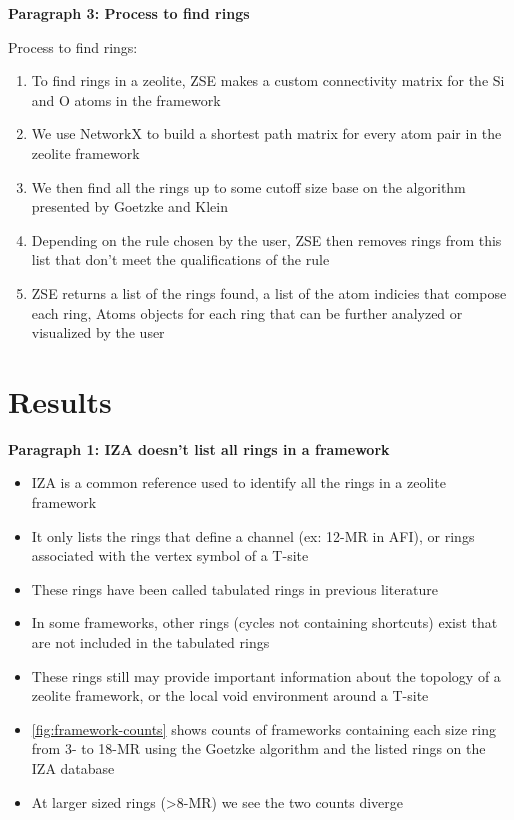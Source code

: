 \documentclass[11pt]{article}
\begin{document}
\textbf{\textbf{Paragraph 3: Process to find rings}}

Process to find rings:
\begin{enumerate}
\item To find rings in a zeolite, ZSE makes a custom connectivity matrix for the Si and O atoms in the framework
\item We use NetworkX \cite{hagberg-exploring-2008} to build a shortest path matrix for every atom pair in the zeolite framework
\item We then find all the rings up to some cutoff size base on the algorithm presented by Goetzke and Klein \cite{goetzke-properties-1991}
\item Depending on the rule chosen by the user, ZSE then removes rings from this list that don't meet the qualifications of the rule
\item ZSE returns a list of the rings found, a list of the atom indicies that compose each ring, Atoms objects for each ring that can be further analyzed or visualized by the user
\end{enumerate}


\section{Results}
\label{sec:orge3c702c}

\textbf{\textbf{Paragraph 1: IZA doesn't list all rings in a framework}}
\begin{itemize}
\item IZA is a common reference used to identify all the rings in a zeolite framework
\item It only lists the rings that define a channel (ex: 12-MR in AFI), or rings associated with the vertex symbol of a T-site
\item These rings have been called tabulated rings in previous literature \cite{curtis-statistical-2003}
\item In some frameworks, other rings (cycles not containing shortcuts) exist that are not included in the tabulated rings
\item These rings still may provide important information about the topology of a zeolite framework, or the local void environment around a T-site
\item \cref{fig:framework-counts} shows counts of frameworks containing each size ring from 3- to 18-MR using the Goetzke algorithm and the listed rings on the IZA database
\item At larger sized rings (>8-MR) we see the two counts diverge
\end{itemize}
\end{document}
